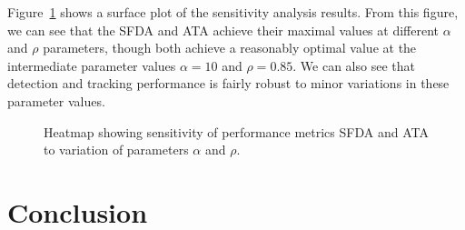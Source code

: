 \documentclass[twocolumn, final]{svjour3}
\begin{document}
Figure~\ref{fig:sens_surf} shows a surface plot of the sensitivity analysis results. From this figure, we can see that the SFDA and ATA achieve their maximal values at different $\alpha$ and $\rho$ parameters, though both achieve a reasonably optimal value at the intermediate parameter values $\alpha = 10$ and $\rho = 0.85$. We can also see that detection and tracking performance is fairly robust to minor variations in these parameter values.

\begin{figure}[!]
  \centering             
  \hspace{6mm}
  \caption{Heatmap showing sensitivity of performance metrics SFDA and ATA to variation of parameters $\alpha$ and $\rho$.}
  \label{fig:sens_surf}
\end{figure}




\section{Conclusion}
\label{sec:conclusion}
\end{document}
